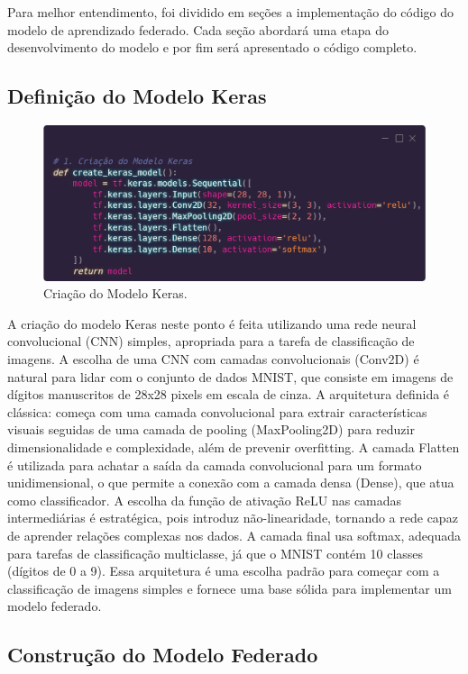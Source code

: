 Para melhor entendimento, foi dividido em seções a implementação do código do modelo de aprendizado federado. Cada seção abordará uma etapa do desenvolvimento do modelo e por fim será apresentado o código completo.

\subsection{Definição do Modelo Keras}

\begin{figure}[ht]
    \centering
    \includegraphics[scale=0.25]{figuras/kerasModel.eps}
    \caption{Criação do Modelo Keras.}
    \label{fig:kerasModel}
\end{figure}

A criação do modelo Keras neste ponto é feita utilizando uma rede neural convolucional (CNN) simples, apropriada para a tarefa de classificação de imagens. A escolha de uma CNN com camadas convolucionais (Conv2D) é natural para lidar com o conjunto de dados MNIST, que consiste em imagens de dígitos manuscritos de 28x28 pixels em escala de cinza. A arquitetura definida é clássica: começa com uma camada convolucional para extrair características visuais seguidas de uma camada de pooling (MaxPooling2D) para reduzir dimensionalidade e complexidade, além de prevenir overfitting. A camada Flatten é utilizada para achatar a saída da camada convolucional para um formato unidimensional, o que permite a conexão com a camada densa (Dense), que atua como classificador. A escolha da função de ativação ReLU nas camadas intermediárias é estratégica, pois introduz não-linearidade, tornando a rede capaz de aprender relações complexas nos dados. A camada final usa softmax, adequada para tarefas de classificação multiclasse, já que o MNIST contém 10 classes (dígitos de 0 a 9). Essa arquitetura é uma escolha padrão para começar com a classificação de imagens simples e fornece uma base sólida para implementar um modelo federado.

\subsection{Construção do Modelo Federado}

